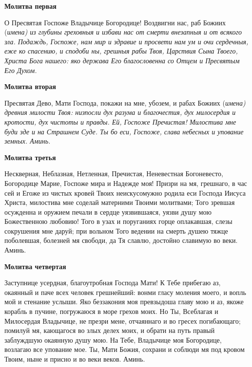 \bfseries Молитва первая\normalfont{}\nopagebreak


О Пресвятая Госпоже Владычице Богородице! Воздвигни нас, раб Божиих (\itshape имена\normalfont{}) из глубины греховныя и избави нас от смерти внезапныя и от всякого зла. Подаждь, Госпоже, нам мир и здравие и просвети нам ум и очи сердечныя, еже ко спасению, и сподоби ны, грешныя рабы Твоя, Царствия Сына Твоего, Христа Бога нашего: яко держава Его благословенна со Отцем и Пресвятым Его Духом. 


\medskip


\bfseries Молитва вторая\normalfont{}\nopagebreak


Пресвятая Дево, Мати Господа, покажи на мне, убозем, и рабах Божиих (\itshape имена\normalfont{}) древния милости Твоя: низпосли дух разума и благочестия, дух милосердия и кротости, дух чистоты и правды. Ей, Госпоже Пречистая! Милостива мне буди зде и на Страшнем Суде. Ты бо еси, Госпоже, слава небесных и упование земных. Аминь.


\medskip


\bfseries Молитва третья\normalfont{}\nopagebreak


Нескверная, Неблазная, Нетленная, Пречистая, Неневестная Богоневесто, Богородице Марие, Госпоже мира и Надежде моя! Призри на мя, грешнаго, в час сей и Егоже из чистых кровей Твоих неискусомужно родила еси Господа Иисуса Христа, милостива мне соделай матерними Твоими молитвами; Того зревшая осужденна и оружием печали в сердце уязвившаяся, уязви душу мою Божественною любовию! Того в узах и поруганиях горце оплакавшая, слезы сокрушения мне даруй; при вольном Того ведении на смерть душею тяжце поболевшая, болезней мя свободи, да Тя славлю, достойно славимую во веки. Аминь.


\medskip


\bfseries Молитва четвертая\normalfont{}\nopagebreak


Заступнице усердная, благоутробная Господа Мати! К Тебе прибегаю аз, окаянный и паче всех человек грешнейший: вонми гласу моления моего, и вопль мой и стенание услыши. Яко беззакония моя превзыдоша главу мою и аз, якоже корабль в пучине, погружаюся в море грехов моих. Но Ты, Всеблагая и Милосердая Владычице, не презри мене, отчаяннаго и во гресех погибающаго; помилуй мя, кающагося во злых делех моих, и обрати на путь правый заблуждшую окаянную душу мою. На Тебе, Владычице моя Богородице, возлагаю все упование мое. Ты, Мати Божия, сохрани и соблюди мя под кровом Твоим, ныне и присно и во веки веков. Аминь.


